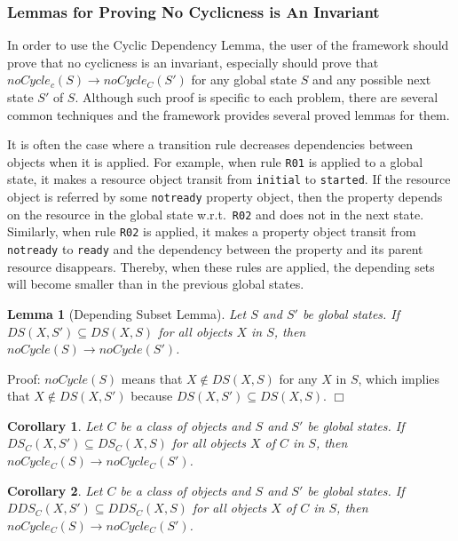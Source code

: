 \documentclass[12pt]{report}
\newtheorem{lemma}{Lemma}
\newtheorem{corollary}{Corollary}
\newcommand{\ra}{\rightarrow}
\begin{document}
\subsubsection{Lemmas for Proving No Cyclicness is An Invariant}
In order to use the Cyclic Dependency Lemma, the user of the framework
should prove that no cyclicness is an invariant, especially should
prove that $noCycle_c(S) \ra noCycle_C(S')$ for any global state $S$
and any possible next state $S'$ of $S$. Although such proof is
specific to each problem, there are several common techniques and the
framework provides several proved lemmas for them.

It is often the case where a transition rule decreases dependencies
between objects when it is applied. For example, when rule {\tt R01}
is applied to a global state, it makes a resource object transit from
{\tt initial} to {\tt started}. If the resource object is referred by
some {\tt notready} property object, then the property depends on the
resource in the global state w.r.t.\ {\tt R02} and does not in the
next state. Similarly, when rule {\tt R02} is applied, it makes a
property object transit from {\tt notready} to {\tt ready} and the
dependency between the property and its parent resource disappears.
Thereby, when these rules are applied, the depending sets will become
smaller than in the previous global states.

\begin{lemma}[Depending Subset Lemma]
Let $S$ and $S'$ be global states.  If $DS(X,S')\subseteq DS(X,S)$ for all
objects $X$ in $S$, then $noCycle(S) \ra noCycle(S')$.
\end{lemma}
Proof: $noCycle(S)$ means that $X\not\in DS(X,S)$ for any $X$ in $S$,
which implies that $X\not\in DS(X,S')$ because $DS(X,S')\subseteq
DS(X,S)$.  $\Box$

\begin{corollary}
Let $C$ be a class of objects and $S$ and $S'$ be global states.  If
$DS_C(X,S')\subseteq DS_C(X,S)$ for all objects $X$ of $C$ in $S$,
then $noCycle_C(S) \ra noCycle_C(S')$.
\end{corollary}

\begin{corollary}
Let $C$ be a class of objects and $S$ and $S'$ be global states.  If
$DDS_C(X,S')\subseteq DDS_C(X,S)$ for all objects $X$ of $C$ in $S$,
then $noCycle_C(S) \ra noCycle_C(S')$.
\end{corollary}
\end{document}
